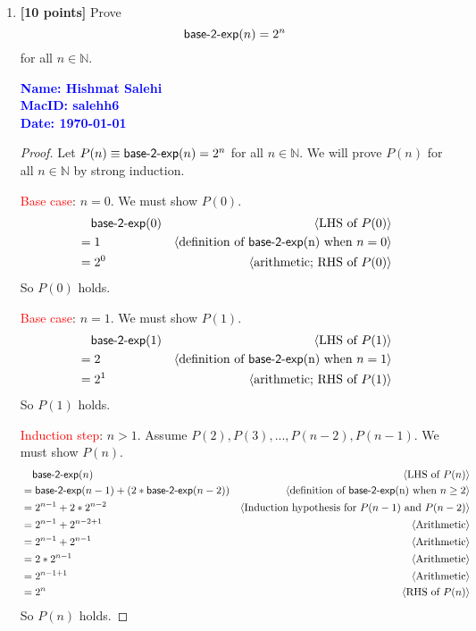 \documentclass[11pt,fleqn]{article}
\newcommand{\mname}[1]{\mbox{\sf #1}}
\newcommand{\pnote}[1]{{\langle \text{#1} \rangle}}
\begin{document}
\begin{enumerate}
\begin{proof}
\medskip

Therefore, $P(n)$ holds for all $n \in \mathbb{N}$ by weak induction.
\end{proof}

  \bigskip

  \item \textbf{[10 points]} Prove \[\mname{base-2-exp}(n) = 2^n\] for
    all $n \in \mathbb{N}$.

  \bigskip

  \textcolor{blue}{\textbf{Name: Hishmat Salehi \\ MacID: salehh6 \\ Date: \today}}

\begin{proof}
Let $P(n) \equiv \mname{base-2-exp}(n) = {2^n}$  for all $n \in \mathbb{N}$.  We will prove $P(n)$
for all $n \in \mathbb{N}$ by strong induction.

\medskip

\textcolor{red}{Base case}: $n = 0$.  We must show $P(0)$.
\begin{align*}
  &\phantom{{}=} \mname{base-2-exp}(0) & \pnote{LHS of $P(0)$}\\
  &= 1          & \pnote{definition of \mname{base-2-exp}(n) when $n = 0$}\\
  &= {2}^0    & \pnote{arithmetic; RHS of $P(0)$}
\end{align*}
So $P(0)$ holds.

\medskip

\textcolor{red}{Base case}: $n = 1$.  We must show $P(1)$.
\begin{align*}
  &\phantom{{}=} \mname{base-2-exp}(1) & \pnote{LHS of $P(1)$}\\
  &= 2         & \pnote{definition of \mname{base-2-exp}(n) when $n = 1$}\\
  &= {2}^1    & \pnote{arithmetic; RHS of $P(1)$}
\end{align*}
So $P(1)$ holds.

\medskip

\textcolor{red}{Induction step}: $n > 1$. Assume $P(2), P(3), ... , P(n-2), P(n-1)$. We must show $P(n)$.
\begin{align*}
  &\phantom{{}=} \mname{base-2-exp}(n)   & \pnote{LHS of $P(n)$}\\
  &= \mname{base-2-exp}(n-1) + (2 * \mname{base-2-exp}(n-2))  & \pnote{definition of \mname{base-2-exp}(n) when $n \ge 2$}\\
  &={2}^{n-1} + 2 * {2}^{n-2}  & \pnote{Induction hypothesis for $P(n-1)$ and $P(n-2)$}\\
  &={2}^{n-1} + {2}^{n-2+1}  & \pnote{Arithmetic}\\
  &={2}^{n-1} + {2}^{n-1}  & \pnote{Arithmetic}\\
  &=2*{2}^{n-1}  & \pnote{Arithmetic}\\
  &={2}^{n-1+1}  & \pnote{Arithmetic}\\
  &= {2}^n & \pnote{RHS of $P(n)$}\\
\end{align*}
So $P(n)$ holds.


\end{proof}
\end{enumerate}
\end{document}
